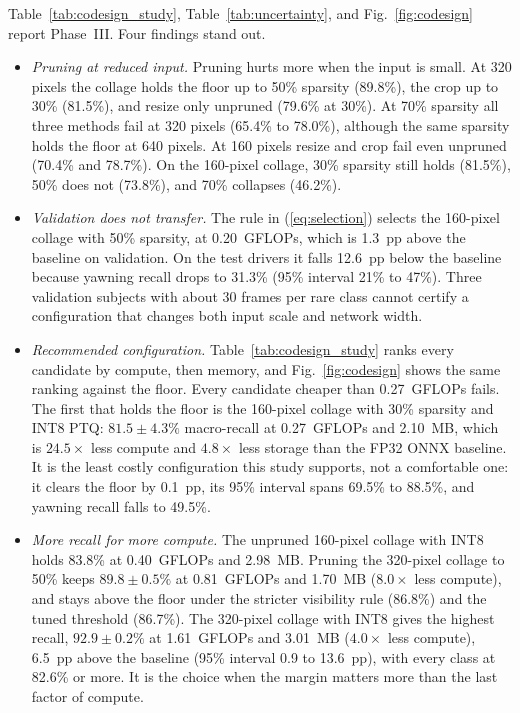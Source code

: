 \documentclass[conference]{IEEEtran}
\begin{document}
Table~\ref{tab:codesign_study}, Table~\ref{tab:uncertainty}, and Fig.~\ref{fig:codesign} report Phase~III. Four findings stand out.
\begin{itemize}
\item \emph{Pruning at reduced input.} Pruning hurts more when the input is small. At 320 pixels the collage holds the floor up to 50\% sparsity (89.8\%), the crop up to 30\% (81.5\%), and resize only unpruned (79.6\% at 30\%). At 70\% sparsity all three methods fail at 320 pixels (65.4\% to 78.0\%), although the same sparsity holds the floor at 640 pixels. At 160 pixels resize and crop fail even unpruned (70.4\% and 78.7\%). On the 160-pixel collage, 30\% sparsity still holds (81.5\%), 50\% does not (73.8\%), and 70\% collapses (46.2\%).
\item \emph{Validation does not transfer.} The rule in (\ref{eq:selection}) selects the 160-pixel collage with 50\% sparsity, at 0.20~GFLOPs, which is 1.3~pp above the baseline on validation. On the test drivers it falls 12.6~pp below the baseline because yawning recall drops to 31.3\% (95\% interval 21\% to 47\%). Three validation subjects with about 30 frames per rare class cannot certify a configuration that changes both input scale and network width.
\item \emph{Recommended configuration.} Table~\ref{tab:codesign_study} ranks every candidate by compute, then memory, and Fig.~\ref{fig:codesign} shows the same ranking against the floor. Every candidate cheaper than 0.27~GFLOPs fails. The first that holds the floor is the 160-pixel collage with 30\% sparsity and INT8 PTQ: $81.5\pm4.3\%$ macro-recall at 0.27~GFLOPs and 2.10~MB, which is $24.5\times$ less compute and $4.8\times$ less storage than the FP32 ONNX baseline. It is the least costly configuration this study supports, not a comfortable one: it clears the floor by 0.1~pp, its 95\% interval spans 69.5\% to 88.5\%, and yawning recall falls to 49.5\%.
\item \emph{More recall for more compute.} The unpruned 160-pixel collage with INT8 holds 83.8\% at 0.40~GFLOPs and 2.98~MB. Pruning the 320-pixel collage to 50\% keeps $89.8\pm0.5\%$ at 0.81~GFLOPs and 1.70~MB ($8.0\times$ less compute), and stays above the floor under the stricter visibility rule (86.8\%) and the tuned threshold (86.7\%). The 320-pixel collage with INT8 gives the highest recall, $92.9\pm0.2\%$ at 1.61~GFLOPs and 3.01~MB ($4.0\times$ less compute), 6.5~pp above the baseline (95\% interval 0.9 to 13.6~pp), with every class at 82.6\% or more. It is the choice when the margin matters more than the last factor of compute.
\end{itemize}
\end{document}
